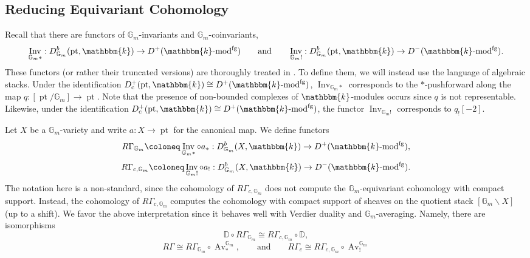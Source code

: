 \documentclass{amsart}
\newcommand{\G}{\mathbb{G}}
\renewcommand{\k}{\mathbbm{k}}
\DeclareMathOperator{\cons}{c}
\DeclareMathOperator{\Inv}{Inv}
\renewcommand{\mod}[1]{#1\textnormal{-mod}}
\newcommand{\DD}{\mathbb{D}}
\DeclareMathOperator{\Av}{Av}
\DeclareMathOperator{\pt}{pt}
\DeclareMathOperator{\fg}{fg}
\theoremstyle{definition}
\begin{document}
    \subsection{Reducing Equivariant Cohomology}

    Recall that there are functors of $\G_m$-invariants and $\G_m$-coinvariants,
    \[\Inv_{\G_m *} : D_{\G_m}^b (\pt, \k) \to D^+ (\mod{\k}^{\fg}) \qquad\text{and}\qquad \Inv_{\G_m !} : D_{\G_m}^b (\pt, \k) \to D^- (\mod{\k}^{\fg}).\]
    These functors (or rather their truncated versions) are thoroughly treated in \cite[Chapter 6]{Ac}.
    To define them, we will instead use the language of algebraic stacks.
    Under the identification $D_{\cons}^+ (\pt, \k) \cong D^+ (\mod{\k}^{\fg})$, $\Inv_{\G_m *}$ corresponds to the $*$-pushforward along the map $q : [\pt/\G_m] \to \pt$. 
    Note that the presence of non-bounded complexes of $\k$-modules occurs since $q$ is not representable.
    Likewise, under the identification $D_{\cons}^+ (\pt, \k) \cong D^+ (\mod{\k}^{\fg})$, the functor $\Inv_{\G_m !}$ corresponds to $q_! [-2]$.

    Let $X$ be a $\G_m$-variety and write $a : X \to \pt$ for the canonical map. We define functors
    \[R\Gamma_{\G_m} \coloneq \Inv_{\G_m *} \circ a_* : D_{\G_m}^b (X, \k) \to D^+ (\mod{\k}^{\fg}),\] 
    \[R\Gamma_{c, \G_m} \coloneq \Inv_{\G_m !} \circ a_! : D_{\G_m}^b (X, \k) \to D^- (\mod{\k}^{\fg}). \] 
    The notation here is a non-standard, since the cohomology of $R\Gamma_{c, \G_m}$ does not compute the $\G_m$-equivariant cohomology with compact support.
    Instead, the cohomology of $R\Gamma_{c, \G_m}$ computes the cohomology with compact support of sheaves on the quotient stack $[\G_m \backslash X]$ (up to a shift). 
    We favor the above interpretation since it behaves well with Verdier duality and $\G_m$-averaging. 
    Namely, there are isomorphisms 
    \[ \DD \circ R\Gamma_{\G_m} \cong R\Gamma_{c, \G_m} \circ \DD,\]
    \[ R\Gamma \cong R\Gamma_{\G_m} \circ \Av_*^{\G_m}, \qquad\text{and}\qquad R\Gamma_c \cong R\Gamma_{c, \G_m} \circ \Av_!^{\G_m}\]
\end{document}
